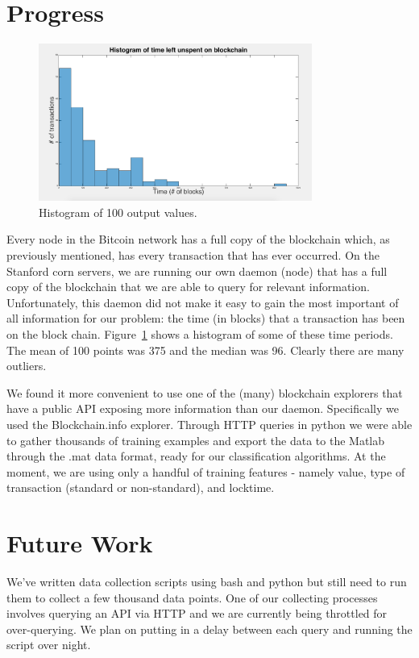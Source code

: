 \documentclass[12pt]{article}
\begin{document}
\section*{Progress}
\begin{figure}
\begin{center}
\includegraphics[width=0.8\textwidth]{figures/hist}
\end{center}
\caption{Histogram of 100 output values.}
\label{histogram}
\end{figure}
Every node in the Bitcoin network has a full copy of the blockchain
which, as previously mentioned, has every transaction that has ever
occurred. On the Stanford corn servers, we are running our own daemon
(node) that has a full copy of the blockchain that we are able to query
for relevant information. Unfortunately, this daemon did not make it
easy to gain the most important of all information for our problem: the
time (in blocks) that a transaction has been on the block chain. Figure~\ref{histogram} shows a histogram of some of these time periods. The mean of 100 points was 375 and the median was 96. Clearly there are many outliers.

We found it more convenient to use one of the (many) blockchain
explorers that have a public API exposing more information than our
daemon. Specifically we used the Blockchain.info explorer. Through HTTP
queries in python we were able to gather thousands of training examples
and export the data to the Matlab through the .mat data format, ready
for our classification algorithms. At the moment, we are using only a handful of training features - namely value, type of transaction (standard or non-standard), and locktime. 

\section*{Future Work}
We've written data collection scripts using bash and python but still need to run them to collect a few thousand data points. One of our collecting processes involves querying an API via HTTP and we are currently being throttled for over-querying. We plan on putting in a delay between each query and running the script over night.
\end{document}
